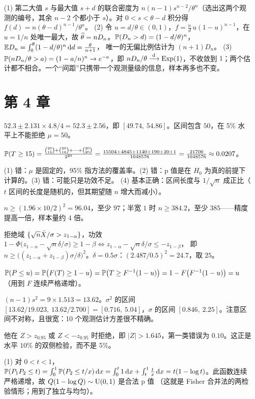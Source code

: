 (1) 第二大值 $s$ 与最大值 $s+d$ 的联合密度为 $n(n-1)s^{n-2}/\theta^n$（选出这两个观测的编号，其余 $n-2$ 个都小于 $s$）。对 $0<s<\theta-d$ 积分得 $f(d)=n(\theta-d)^{n-1}/\theta^n$。
(2) 令 $u=d/\theta\in(0,1)$，$f=\frac nd\,u(1-u)^{n-1}$，在 $u=1/n$ 处唯一最大，故 $\hatt\theta=nD_n$。$\P(D_n>d)=(1-d/\theta)^n$，$\E D_n=\int_0^\theta(1-d/\theta)^n\dd d=\frac{\theta}{n+1}$，
唯一的无偏比例估计为 $(n+1)D_n$。
(3) $\P(nD_n/\theta>a)=(1-a/n)^n\to e^{-a}$，即 $nD_n/\theta\tod\Exp(1)$，不收敛到 $1$；两个估计都不相合。一个“间距”只携带一个观测量级的信息，样本再多也不变。

\section*{第 4 章}

$52.3\pm2.131\times4.8/4=52.3\pm2.56$，即 $[49.74,\ 54.86]$。区间包含 $50$，在 5\% 水平上不能拒绝 $\mu=50$。

$\P(T\ge15)=\frac{\binom{20}{15}+\binom{20}{16}+\dots+\binom{20}{20}}{2^{20}}=\frac{15504+4845+1140+190+20+1}{1048576}=\frac{21700}{1048576}\approx0.0207$。

(1) 错：$\mu$ 是固定的，95\% 指方法的覆盖率。(2) 错：p 值是在 $H_0$ 为真的前提下计算的。(3) 错：可能只是功效不足。
(4) 基本正确：区间长度与 $1/\sqrt n$ 成正比（$t$ 区间的长度是随机的，但其期望随 $n$ 增大而减小）。

$n\ge(1.96\times10/2)^2=96.04$，至少 $97$；半宽 $1$ 时 $n\ge384.2$，至少 $385$——精度提高一倍，样本量约 4 倍。

拒绝域 $\{\sqrt n\Xbar/\sigma>z_{1-\alpha}\}$，功效 $1-\Phi\big(z_{1-\alpha}-\sqrt n\delta/\sigma\big)\ge1-\beta\iff z_{1-\alpha}-\sqrt n\delta/\sigma\le-z_{1-\beta}$，
即 $n\ge\big((z_{1-\alpha}+z_{1-\beta})\sigma/\delta\big)^2$。$\delta=0.5\sigma$：$(2.487/0.5)^2=24.7$，取 $25$。

$\P(P\le u)=\P\big(F(T)\ge1-u\big)=\P\big(T\ge F^{-1}(1-u)\big)=1-F\big(F^{-1}(1-u)\big)=u$（用到 $F$ 连续严格递增）。

$(n-1)s^2=9\times1.513=13.62$。$\sigma^2$ 的区间 $[13.62/19.023,\ 13.62/2.700]=[0.716,\ 5.04]$，$\sigma$ 的区间 $[0.846,\ 2.25]$。注意区间不对称，且很宽：10 个观测估计方差很不精确。

他在 $Z>z_{0.95}$ 或 $Z<-z_{0.95}$ 时拒绝，即 $|Z|>1.645$，第一类错误为 $0.10$。这正是水平 $10\%$ 的双侧检验，而不是 5\%。

(1) 对 $0<t<1$，$\P(P_1P_2\le t)=\int_0^1\P(P_2\le t/x)\dd x=\int_0^t1\dd x+\int_t^1\frac tx\dd x=t(1-\log t)$。此函数连续严格递增，故 $Q(1-\log Q)\sim\Unif(0,1)$ 是合法 p 值
（这就是 Fisher 合并法的两检验情形；用到了独立与均匀）。

